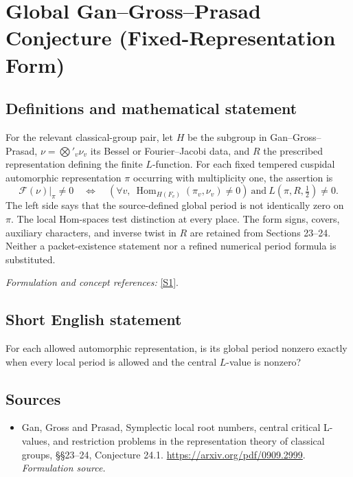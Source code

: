 \documentclass[11pt]{article}
\begin{document}
\section*{\texorpdfstring{Global Gan–Gross–Prasad Conjecture (Fixed-Representation Form)}{Global Gan–Gross–Prasad Conjecture (Fixed-Representation Form)}}\label{138}
\subsection{Definitions and mathematical statement}
For the relevant classical-group pair, let $H$ be the subgroup in Gan--Gross--Prasad, $\nu=\bigotimes'_v\nu_v$ its Bessel or Fourier--Jacobi data, and $R$ the prescribed representation defining the finite $L$-function. For each fixed tempered cuspidal automorphic representation $\pi$ occurring with multiplicity one, the assertion is
\[
 \mathcal F(\nu)|_\pi\ne0
 \quad\Longleftrightarrow\quad
 \left(\forall v,\ \operatorname{Hom}_{H(F_v)}(\pi_v,\nu_v)\ne0\right)
 \ \text{and}\ L(\pi,R,\tfrac12)\ne0.
\]
The left side says that the source-defined global period is not identically zero on $\pi$. The local Hom-spaces test distinction at every place. The form signs, covers, auxiliary characters, and inverse twist in $R$ are retained from Sections 23--24. Neither a packet-existence statement nor a refined numerical period formula is substituted.
\par\smallskip\textit{Formulation and concept references:} \href{https://arxiv.org/pdf/0909.2999}{[S1]}.

\subsection{Short English statement}
For each allowed automorphic representation, is its global period nonzero exactly when every local period is allowed and the central $L$-value is nonzero?
\subsection{Sources}
\begin{itemize}
\item[S1]Gan, Gross and Prasad, Symplectic local root numbers, central critical L-values, and restriction problems in the representation theory of classical groups, §§23–24, Conjecture 24.1.
\url{https://arxiv.org/pdf/0909.2999}.
\textit{Formulation source.}
\end{itemize}
\end{document}
